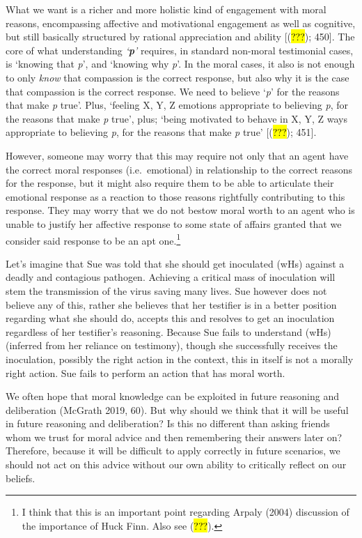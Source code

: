 \documentclass[
  letterpaper,
  DIV=11,
  numbers=noendperiod]{scrartcl}
\theoremstyle{remark}
\begin{document}
What we want is a richer and more holistic kind of engagement with moral
reasons, encompassing affective and motivational engagement as well as
cognitive, but still basically structured by rational appreciation and
ability {[}(\hl{???}); 450{]}. The core of what understanding
\emph{`\textbf{p}'} requires, in standard non-moral testimonial cases,
is `knowing that \emph{p}', and `knowing why \emph{p}'. In the moral
cases, it also is not enough to only \emph{know} that compassion is the
correct response, but also why it is the case that compassion is the
correct response. We need to believe `\emph{p}' for the reasons that
make \emph{p} true'. Plus, `feeling X, Y, Z emotions appropriate to
believing \emph{p}, for the reasons that make \emph{p} true', plus;
`being motivated to behave in X, Y, Z ways appropriate to believing
\emph{p}, for the reasons that make \emph{p} true' {[}(\hl{???});
451{]}.

However, someone may worry that this may require not only that an agent
have the correct moral responses (i.e.~emotional) in relationship to the
correct reasons for the response, but it might also require them to be
able to articulate their emotional response as a reaction to those
reasons rightfully contributing to this response. They may worry that we
do not bestow moral worth to an agent who is unable to justify her
affective response to some state of affairs granted that we consider
said response to be an apt one.\footnote{I think that this is an
  important point regarding Arpaly (2004) discussion of the importance
  of Huck Finn. Also see (\hl{???}).}

Let's imagine that Sue was told that she should get inoculated (wHs)
against a deadly and contagious pathogen. Achieving a critical mass of
inoculation will stem the transmission of the virus saving many lives.
Sue however does not believe any of this, rather she believes that her
testifier is in a better position regarding what she should do, accepts
this and resolves to get an inoculation regardless of her testifier's
reasoning. Because Sue fails to understand (wHs) (inferred from her
reliance on testimony), though she successfully receives the
inoculation, possibly the right action in the context, this in itself is
not a morally right action. Sue fails to perform an action that has
moral worth.

We often hope that moral knowledge can be exploited in future reasoning
and deliberation (McGrath 2019, 60). But why should we think that it
will be useful in future reasoning and deliberation? Is this no
different than asking friends whom we trust for moral advice and then
remembering their answers later on? Therefore, because it will be
difficult to apply correctly in future scenarios, we should not act on
this advice without our own ability to critically reflect on our
beliefs.
\end{document}
